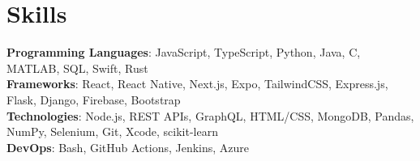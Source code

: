 

\section*{Skills}
	\textbf{Programming Languages}{: JavaScript, TypeScript, Python, Java, C, MATLAB, SQL, Swift, Rust} \\
	\textbf{Frameworks}{: React, React Native, Next.js, Expo, TailwindCSS, Express.js, Flask, Django, Firebase, Bootstrap} \\
	\textbf{Technologies}{: Node.js, REST APIs, GraphQL,  HTML/CSS, MongoDB, Pandas, NumPy, Selenium, Git, Xcode, scikit-learn} \\
	\textbf{DevOps}{: Bash, GitHub Actions, Jenkins, Azure} \\
\vspace{-6.5pt}